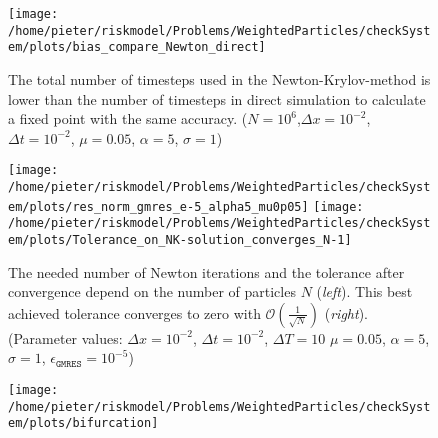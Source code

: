 \begin{figure}
\centering
\texttt{[image: /home/pieter/riskmodel/Problems/WeightedParticles/checkSystem/plots/bias\_compare\_Newton\_direct]}
\caption{The total number of timesteps used in the Newton-Krylov-method is lower than the number of timesteps  in direct simulation to calculate a fixed point with the same accuracy. ($N=10^6$,$\Delta x = 10^{-2}$, $\Delta t = 10^{-2}$, $\mu=0.05$, $\alpha=5$, $\sigma=1$) }
\label{fig:bias_compare_Newton_direct}
\end{figure}

\begin{figure}
\centering
\texttt{[image: /home/pieter/riskmodel/Problems/WeightedParticles/checkSystem/plots/res\_norm\_gmres\_e-5\_alpha5\_mu0p05]}
\texttt{[image: /home/pieter/riskmodel/Problems/WeightedParticles/checkSystem/plots/Tolerance\_on\_NK-solution\_converges\_N-1]}
\caption{The needed number of Newton iterations and the tolerance after convergence depend on the number of particles $N$ (\textit{left}). This best achieved tolerance converges to zero with  $\mathcal{O}(\frac{1}{\sqrt{N}})$ (\textit{right}). (Parameter values: $\Delta x = 10^{-2}$, $\Delta t = 10^{-2}$, $\Delta T = 10 $ $\mu=0.05$, $\alpha=5$, $\sigma=1$, $ \epsilon_{\texttt{GMRES}}=10^{-5}$)}
\label{fig:Tolerance_on_NK-solution_converges_N-1}
\end{figure}

\begin{figure}
\centering
\texttt{[image: /home/pieter/riskmodel/Problems/WeightedParticles/checkSystem/plots/bifurcation]}
\caption{}
\label{fig:bifurcation}
\end{figure}



